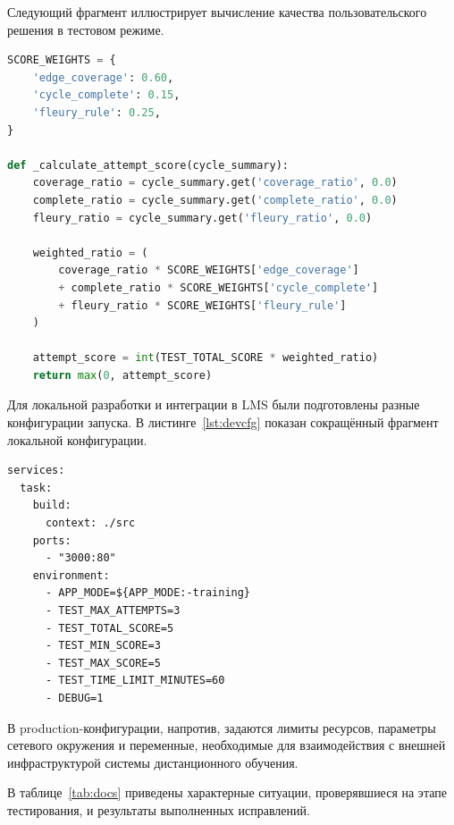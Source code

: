 \documentclass[a4paper,12pt]{extarticle}
\begin{document}
Следующий фрагмент иллюстрирует вычисление качества пользовательского решения в тестовом режиме.

\begin{lstlisting}[language=Python, caption={Фрагмент вычисления оценки решения}]
SCORE_WEIGHTS = {
    'edge_coverage': 0.60,
    'cycle_complete': 0.15,
    'fleury_rule': 0.25,
}

def _calculate_attempt_score(cycle_summary):
    coverage_ratio = cycle_summary.get('coverage_ratio', 0.0)
    complete_ratio = cycle_summary.get('complete_ratio', 0.0)
    fleury_ratio = cycle_summary.get('fleury_ratio', 0.0)

    weighted_ratio = (
        coverage_ratio * SCORE_WEIGHTS['edge_coverage']
        + complete_ratio * SCORE_WEIGHTS['cycle_complete']
        + fleury_ratio * SCORE_WEIGHTS['fleury_rule']
    )

    attempt_score = int(TEST_TOTAL_SCORE * weighted_ratio)
    return max(0, attempt_score)
\end{lstlisting}


Для локальной разработки и интеграции в LMS были подготовлены разные конфигурации запуска. В листинге~\ref{lst:devcfg} показан сокращённый фрагмент локальной конфигурации.

\begin{lstlisting}[language={}, caption={Фрагмент локальной конфигурации запуска}, label={lst:devcfg}]
services:
  task:
    build:
      context: ./src
    ports:
      - "3000:80"
    environment:
      - APP_MODE=${APP_MODE:-training}
      - TEST_MAX_ATTEMPTS=3
      - TEST_TOTAL_SCORE=5
      - TEST_MIN_SCORE=3
      - TEST_MAX_SCORE=5
      - TEST_TIME_LIMIT_MINUTES=60
      - DEBUG=1
\end{lstlisting}

В production-конфигурации, напротив, задаются лимиты ресурсов, параметры сетевого окружения и переменные, необходимые для взаимодействия с внешней инфраструктурой системы дистанционного обучения.


В таблице~\ref{tab:docs} приведены характерные ситуации, проверявшиеся на этапе тестирования, и результаты выполненных исправлений.
\end{document}
